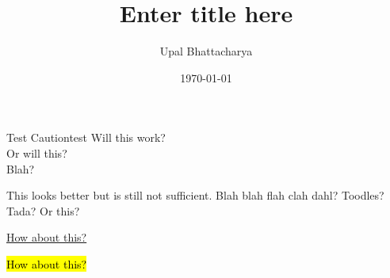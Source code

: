 \documentclass[a4paper]{article}
\author{Upal Bhattacharya}
\date{\today}
\title{Enter title here}
\begin{document}
\maketitle

\linenumbers
\begin{linenomath*}
\begin{caution}{Test Caution}{test}
  Will this work? \\
  Or will this? \\
  Blah?
\end{caution}
\end{linenomath*}

This looks better but is still not sufficient. Blah blah flah clah dahl? Toodles?
Tada? Or this?

\ul{How about this?}

\hl{How about this?}
\end{document}
